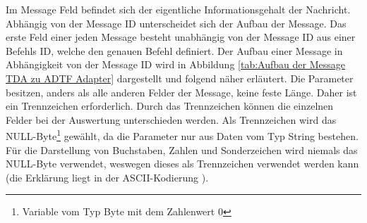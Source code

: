 \documentclass[12pt,a4paper]{report}
\begin{document}
Im Message Feld befindet sich der eigentliche Informationsgehalt der Nachricht. Ab\-hängig von der Message ID unterscheidet sich der Aufbau der Message. Das erste Feld einer jeden Message besteht unabhängig von der Message ID aus einer Befehls ID, welche den genauen Befehl definiert. Der Aufbau einer Message in Abhängigkeit von der Message ID wird in Abbildung \ref{tab:Aufbau der Message TDA zu ADTF Adapter} dargestellt und folgend näher erläutert. Die Parameter besitzen, anders als alle anderen Felder der Message, keine feste Länge. Daher ist ein Trennzeichen erforderlich. Durch das Trennzeichen können die einzelnen Felder bei der Auswertung unterschieden werden. Als Trennzeichen wird das NULL-Byte\footnote{Variable vom Typ Byte mit dem Zahlenwert 0} gewählt, da die Parameter nur aus Daten vom Typ String bestehen. Für die Darstellung von Buchstaben, Zahlen und Sonderzeichen wird niemals das NULL-Byte verwendet, weswegen dieses als Trennzeichen verwendet werden kann (die Erklärung liegt in der ASCII-Kodierung \cite{WikipediaASCII}).
\end{document}
